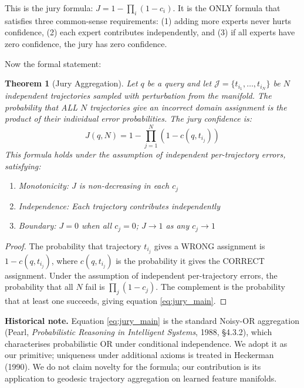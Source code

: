 \documentclass[11pt]{article}
\newtheorem{theorem}{Theorem}[section]
\begin{document}
This is the jury formula: $J = 1 - \prod_i (1-c_i)$. It is the ONLY
formula that satisfies three common-sense requirements: (1) adding more experts
never hurts confidence, (2) each expert contributes independently, and (3) if
all experts have zero confidence, the jury has zero confidence.

Now the formal statement:

\begin{theorem}[Jury Aggregation]\label{thm:jury}
Let $q$ be a query and let $\mathcal{J} = \{t_{i_1}, \ldots, t_{i_N}\}$ be $N$ independent trajectories sampled with perturbation from the manifold. The probability that ALL $N$ trajectories give an incorrect domain assignment is the product of their individual error probabilities. The jury confidence is:
\begin{equation}\label{eq:jury_main}
J(q, N) = 1 - \prod_{j=1}^{N} (1 - c(q, t_{i_j}))
\end{equation}
This formula holds under the assumption of independent per-trajectory errors, satisfying:
\begin{enumerate}[nosep,label=(\roman*)]
\item Monotonicity: $J$ is non-decreasing in each $c_j$
\item Independence: Each trajectory contributes independently
\item Boundary: $J = 0$ when all $c_j = 0$; $J \to 1$ as any $c_j \to 1$
\end{enumerate}
\end{theorem}
\begin{proof}
The probability that trajectory $t_{i_j}$ gives a WRONG assignment is $1 - c(q, t_{i_j})$, where $c(q, t_{i_j})$ is the probability it gives the CORRECT assignment. Under the assumption of independent per-trajectory errors, the probability that all $N$ fail is $\prod_j (1-c_j)$. The complement is the probability that at least one succeeds, giving equation \ref{eq:jury_main}.
\end{proof}

\textbf{Historical note.} Equation \ref{eq:jury_main} is the standard Noisy-OR aggregation (Pearl, \textit{Probabilistic Reasoning in Intelligent Systems}, 1988, \S4.3.2), which characterises probabilistic OR under conditional independence. We adopt it as our primitive; uniqueness under additional axioms is treated in Heckerman (1990). We do not claim novelty for the formula; our contribution is its application to geodesic trajectory aggregation on learned feature manifolds.
\end{document}
